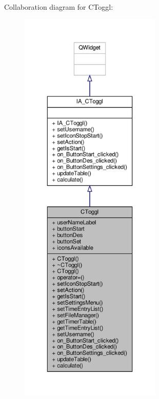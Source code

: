 Collaboration diagram for C\+Toggl\+:
\nopagebreak
\begin{figure}[H]
\begin{center}
\leavevmode
\includegraphics[height=550pt]{classCToggl__coll__graph}
\end{center}
\end{figure}
